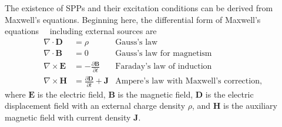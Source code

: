 The existence of SPPs and their excitation conditions 
can be derived from Maxwell's equations.  Beginning here, the differential form of
Maxwell's equations~\cite{maier2007plasmonics}~\cite{benson2009elements}
including external sources are
\begin{align}
\nabla \cdot \mathbf{D} &= \rho & \text{Gauss's law} \label{eqn:gausslaw}\\
\nabla \cdot \mathbf{B} &= 0 & \text{Gauss's law for magnetism} \label{eqn:gausslawmagnetism}\\
\nabla \times \mathbf{E} &= -\frac{\partial \mathbf{B}} {\partial t}
& \text{Faraday's law of induction} \label{eqn:faradayslaw} \\
\nabla \times \mathbf{H} &= \frac{\partial \mathbf{D}} {\partial
t} + \mathbf{J}  & \text{Ampere's law with Maxwell's correction},
\label{eqn:ampereslaw}
\end{align}
where $\mathbf{E}$ is the electric field, $\mathbf{B}$ is the magnetic
field, $\mathbf{D}$ is the electric displacement field with an external
charge density $\rho$, and $\mathbf{H}$ is the auxiliary magnetic field
with current density $\mathbf{J}$.

